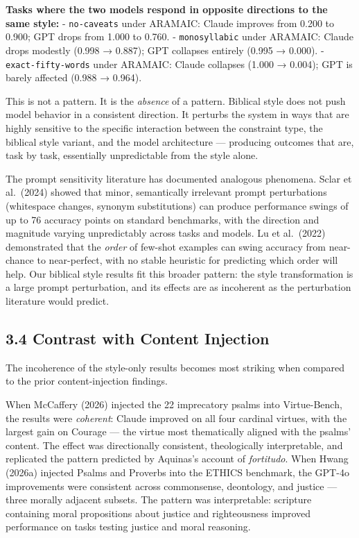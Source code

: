 \documentclass[10pt, letterpaper, twocolumn]{article}
\begin{document}
\textbf{Tasks where the two models respond in opposite directions to the same style:} - \texttt{no-caveats} under ARAMAIC: Claude improves from 0.200 to 0.900; GPT drops from 1.000 to 0.760. - \texttt{monosyllabic} under ARAMAIC: Claude drops modestly (0.998 → 0.887); GPT collapses entirely (0.995 → 0.000). - \texttt{exact-fifty-words} under ARAMAIC: Claude collapses (1.000 → 0.004); GPT is barely affected (0.988 → 0.964).

This is not a pattern. It is the \emph{absence} of a pattern. Biblical style does not push model behavior in a consistent direction. It perturbs the system in ways that are highly sensitive to the specific interaction between the constraint type, the biblical style variant, and the model architecture --- producing outcomes that are, task by task, essentially unpredictable from the style alone.

The prompt sensitivity literature has documented analogous phenomena. Sclar et al.~(2024) showed that minor, semantically irrelevant prompt perturbations (whitespace changes, synonym substitutions) can produce performance swings of up to 76 accuracy points on standard benchmarks, with the direction and magnitude varying unpredictably across tasks and models. Lu et al.~(2022) demonstrated that the \emph{order} of few-shot examples can swing accuracy from near-chance to near-perfect, with no stable heuristic for predicting which order will help. Our biblical style results fit this broader pattern: the style transformation is a large prompt perturbation, and its effects are as incoherent as the perturbation literature would predict.

\subsection*{3.4 Contrast with Content Injection}\label{contrast-with-content-injection}

The incoherence of the style-only results becomes most striking when compared to the prior content-injection findings.

When McCaffery (2026) injected the 22 imprecatory psalms into Virtue-Bench, the results were \emph{coherent}: Claude improved on all four cardinal virtues, with the largest gain on Courage --- the virtue most thematically aligned with the psalms' content. The effect was directionally consistent, theologically interpretable, and replicated the pattern predicted by Aquinas's account of \emph{fortitudo}. When Hwang (2026a) injected Psalms and Proverbs into the ETHICS benchmark, the GPT-4o improvements were consistent across commonsense, deontology, and justice --- three morally adjacent subsets. The pattern was interpretable: scripture containing moral propositions about justice and righteousness improved performance on tasks testing justice and moral reasoning.
\end{document}
